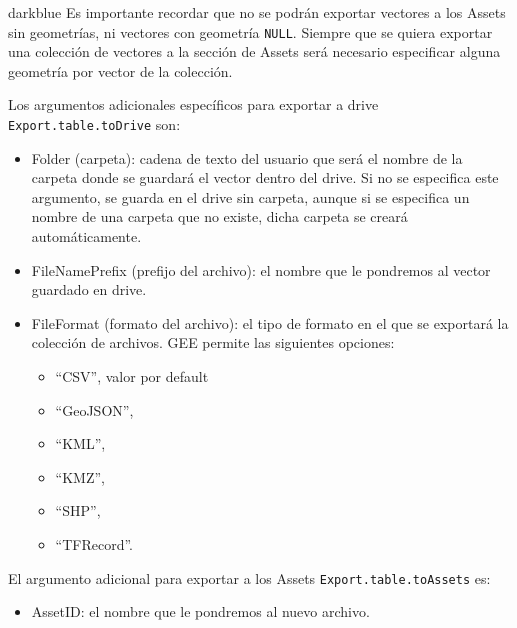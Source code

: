 \documentclass[
  12pt,
  letterpaper,
  twoside]{book}
\providecommand{\tightlist}{%
  \setlength{\itemsep}{0pt}\setlength{\parskip}{0pt}}
\begin{document}
\begin{bluebox2}

\begin{awesomeblock}{5pt}{\faLightbulb}{darkblue}
Es importante recordar que no se podrán exportar vectores a los Assets sin geometrías, ni vectores con geometría \texttt{NULL}. Siempre que se quiera exportar una colección de vectores a la sección de Assets será necesario especificar alguna geometría por vector de la colección.

\end{awesomeblock}

\end{bluebox2}

Los argumentos adicionales específicos para exportar a drive \texttt{Export.table.toDrive} son:

\begin{itemize}
\item
  Folder (carpeta): cadena de texto del usuario que será el nombre de la carpeta donde se guardará el vector dentro del drive. Si no se especifica este argumento, se guarda en el drive sin carpeta, aunque si se especifica un nombre de una carpeta que no existe, dicha carpeta se creará automáticamente.
\item
  FileNamePrefix (prefijo del archivo): el nombre que le pondremos al vector guardado en drive.
\item
  FileFormat (formato del archivo): el tipo de formato en el que se exportará la colección de archivos. GEE permite las siguientes opciones:

  \begin{itemize}
  \tightlist
  \item
    ``CSV'', valor por default
  \item
    ``GeoJSON'',
  \item
    ``KML'',
  \item
    ``KMZ'',
  \item
    ``SHP'',
  \item
    ``TFRecord''.
  \end{itemize}
\end{itemize}

El argumento adicional para exportar a los Assets \texttt{Export.table.toAssets} es:

\begin{itemize}
\tightlist
\item
  AssetID: el nombre que le pondremos al nuevo archivo.
\end{itemize}
\end{document}
